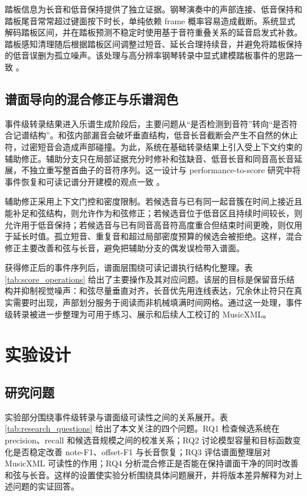 \documentclass[UTF8,a4paper,zihao=-4]{ctexart}
\begin{document}
踏板信息为长音和低音保持提供了独立证据。钢琴演奏中的声部连接、低音保持和踏板尾音常常超过键面按下时长，单纯依赖 frame 概率容易造成截断。系统显式解码踏板区间，并在踏板预测不稳定时使用基于音符重叠关系的延音启发式补救。踏板感知清理随后根据踏板区间调整过短音、延长合理持续音，并避免将踏板保持的低音误删为孤立噪声。该处理与高分辨率钢琴转录中显式建模踏板事件的思路一致 \cite{kong2021highres}。

\subsection{谱面导向的混合修正与乐谱润色}

事件级转录结果进入乐谱生成阶段后，主要问题从“是否检测到音符”转向“是否符合记谱结构”。和弦内部漏音会破坏垂直结构，低音长音截断会产生不自然的休止符，过密短音会造成声部碰撞。为此，系统在基础转录结果上引入受上下文约束的辅助修正。辅助分支只在局部证据充分时修补和弦缺音、低音长音和同音高长音延展，不独立重写整首曲子的音符序列。这一设计与 performance-to-score 研究中将事件恢复和可读记谱分开建模的观点一致 \cite{liu2022pm2s,suzuki2021scoretransformer,beyer2024midi2score}。

辅助修正采用上下文门控和密度限制。若候选音与已有同一起音簇在时间上接近且能补足和弦结构，则允许作为和弦修正；若候选音位于低音区且持续时间较长，则允许用于低音保持；若候选音与已有同音高音符高度重合但结束时间更晚，则仅用于延长时值。孤立短音、重复音和超过局部密度预算的候选会被拒绝。这样，混合修正主要改善和弦与长音，避免把辅助分支的偶发误检带入谱面。

获得修正后的事件序列后，谱面层围绕可读记谱执行结构化整理。表 \ref{tab:score_operations} 给出了主要操作及其对应问题。该层的目标是保留音乐结构并抑制视觉噪声：和弦尽量垂直对齐，长音优先用连线表达，冗余休止符只在真实需要时出现，声部划分服务于阅读而非机械填满时间网格。通过这一处理，事件级转录被进一步整理为可用于练习、展示和后续人工校订的 MusicXML。



\section{实验设计}

\subsection{研究问题}

实验部分围绕事件级转录与谱面级可读性之间的关系展开。表 \ref{tab:research_questions} 给出了本文关注的四个问题。RQ1 检查候选系统在 precision、recall 和候选音规模之间的校准关系；RQ2 讨论模型容量和目标函数变化是否稳定改善 note-F1、offset-F1 与长音恢复；RQ3 评估谱面整理层对 MusicXML 可读性的作用；RQ4 分析混合修正是否能在保持谱面干净的同时改善和弦与长音。这样的设置使实验分析围绕具体问题展开，并将版本差异解释为对上述问题的实证回答。
\end{document}
